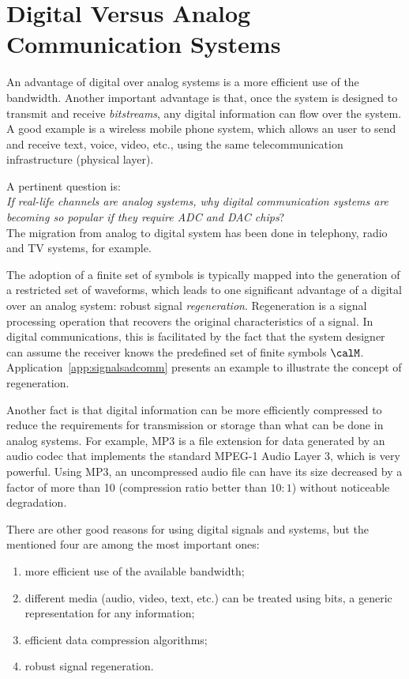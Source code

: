 \section{Digital Versus Analog Communication Systems}

An advantage of digital over analog systems is a more efficient use of the bandwidth. Another important advantage is that, once the system is designed to transmit and receive \emph{bitstreams}, any digital information can flow over the system. A good example is a wireless mobile phone system, which allows an user to send and receive text, voice, video, etc., using the same telecommunication infrastructure (physical layer). 

A pertinent question is:\\
\textendash \emph{If real-life channels are analog systems, why digital communication systems are becoming so popular if they require ADC and DAC chips}?\\
The migration from analog to digital system has been done in telephony, radio and TV systems, for example. 

The adoption of a finite set of symbols is typically mapped into the generation of a restricted set of waveforms, which leads to one significant advantage of a digital over an analog system: robust signal \emph{regeneration}. Regeneration is a signal processing operation that recovers the original characteristics of a signal. In digital communications, this is facilitated by the fact that the system designer can assume the receiver knows the predefined set of finite symbols $\calM$. Application~\ref{app:signalsadcomm} presents an example to illustrate the concept of regeneration.

Another fact is that digital information can be more efficiently compressed to reduce the requirements for transmission or storage than what can be done in analog systems. For example, MP3 is a file extension for data generated by an audio codec that implements the standard MPEG-1 Audio Layer 3, which is very powerful. Using MP3, an uncompressed audio file can have its size decreased by a factor of more than 10 (compression ratio better than $10:1$) without noticeable degradation. 

There are other good reasons for using digital signals and systems, but the mentioned four are among the most important ones:
\begin{enumerate}
	\item more efficient use of the available bandwidth;
	\item different media (audio, video, text, etc.) can be treated using bits, a generic representation for any information;
	\item efficient data compression algorithms;
	\item robust signal regeneration.
\end{enumerate}

